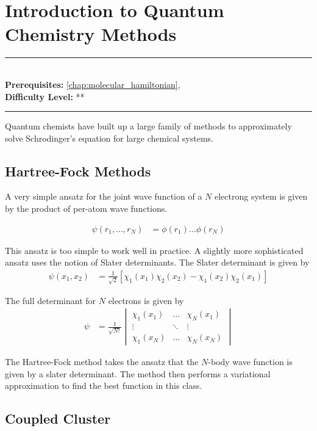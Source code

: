 \documentclass[book.tex]{subfiles}
\begin{document}
\chapter{Introduction to Quantum Chemistry Methods}
\label{chap:hartree_fock}
\noindent\rule{11cm}{0.4pt} \\
\textbf{Prerequisites:} \autoref{chap:molecular_hamiltonian},  \\
\textbf{Difficulty Level:} ** \\
\noindent\rule{11cm}{0.4pt}
\vspace{5mm}

Quantum chemists have built up a large family of methods to approximately solve Schrodinger's equation for large chemical systems.

\section{Hartree-Fock Methods}

A very simple ansatz for the joint wave function of a $N$ electrong system is given by the product of per-atom wave functions.

\begin{align}
\psi(r_1,\dotsc,r_N) &= \phi(r_1)\dotsc \phi(r_N)
\end{align}

This ansatz is too simple to work well in practice. A slightly more sophisticated ansatz uses the notion of Slater determinants. The Slater determinant is given by
\begin{align}
\psi(x_1, x_2) &= \frac{1}{\sqrt{2}} [ \chi_1(x_1)\chi_2(x_2) - \chi_1(x_2)\chi_2(x_1)]
\end{align}

The full determinant for $N$ electrons is given by
\begin{align}
\psi &= \frac{1}{\sqrt{N!}}\begin{vmatrix}
    \chi_1(x_1) & \dotsc & \chi_N(x_1) \\
    \vdots & \ddots & \vdots \\
    \chi_1(x_N) & \dotsc & \chi_N(x_N)
    \end{vmatrix}
\end{align}

The Hartree-Fock method takes the ansatz that the $N$-body wave function is given by a slater determinant. The method then performs a variational approximation to find the best function in this class.

\section{Coupled Cluster}
\end{document}
